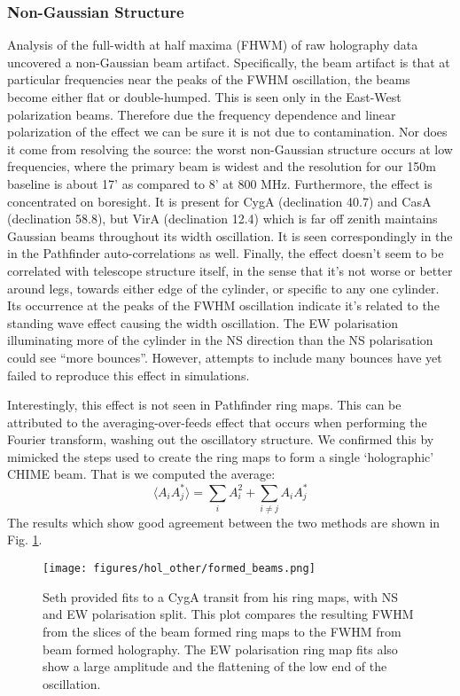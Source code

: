 \subsubsection{Non-Gaussian Structure}

Analysis of the full-width at half maxima (FHWM) of raw holography data uncovered a non-Gaussian beam artifact. Specifically, the beam artifact is that at particular frequencies near the peaks of the FWHM oscillation, the beams become either flat or double-humped. This is seen only in the East-West polarization beams. Therefore due the frequency dependence and linear polarization of the effect we can be sure it is not due to contamination. Nor does it come from resolving the source: the worst non-Gaussian structure occurs at low frequencies, where the primary beam is widest and the resolution for our 150m baseline is about 17' as compared to 8' at 800 MHz. Furthermore, the effect  is concentrated on boresight. It is present for CygA (declination 40.7) and CasA (declination 58.8), but VirA (declination 12.4) which is far off zenith maintains Gaussian beams throughout its width oscillation. It is seen correspondingly in the in the Pathfinder auto-correlations as well. Finally, the effect doesn't seem to be correlated with telescope structure itself, in the sense that it's not worse or better around legs, towards either edge of the cylinder, or specific to any one cylinder. Its occurrence at the peaks of the FWHM oscillation indicate it's related to the standing wave effect causing the width oscillation. The EW polarisation illuminating more of the cylinder in the NS direction than the NS polarisation could see ``more bounces''. However, attempts to include many bounces have yet failed to reproduce this effect in simulations.

Interestingly, this effect is not seen in Pathfinder ring maps. This can be attributed to the averaging-over-feeds effect that occurs when performing the Fourier transform, washing out the oscillatory structure. We confirmed this by mimicked the steps used to create the ring maps to form a single `holographic' CHIME beam. That is we computed the average:
\begin{equation}
\langle A_i A_j^* \rangle = \sum_i A_i^2 + \sum_{i \neq j} A_iA_j^*
\end{equation}
The results which show good agreement between the two methods are shown in Fig. \ref{formed_beams}.

\begin{figure}[h!]
\texttt{[image: figures/hol\_other/formed\_beams.png]}
\caption{Seth provided fits to a CygA transit from his ring maps, with NS and EW polarisation split. This plot compares the resulting FWHM from the slices of the beam formed ring maps to the FWHM from beam formed holography. The EW polarisation ring map fits also show a large amplitude and the flattening of the low end of the oscillation.}
\label{formed_beams}
\end{figure}


